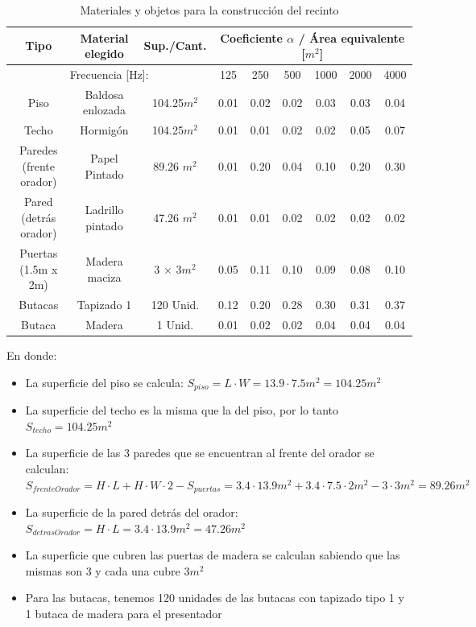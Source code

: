 \begin{table}[H]
    \centering
    \begin{tabular}{|c|c|c||c|c|c|c|c|c|} \hline
        Tipo &  Material elegido &Sup./Cant. & \multicolumn{6}{|c|}{Coeficiente $\alpha$ / Área equivalente [$m^2$]} \\ \hline
        \multicolumn{3}{|c|}{Frecuencia [Hz]:} & 125 & 250 & 500 & 1000 & 2000 & 4000 \\ \hline \hline
        Piso & Baldosa enlozada & 104.25$m^2$ & 0.01 & 0.02 & 0.02 & 0.03 & 0.03 & 0.04 \\ \hline
        Techo & Hormigón & 104.25$m^2$ & 0.01 & 0.01 & 0.02 & 0.02 & 0.05 & 0.07 \\ \hline
        Paredes (frente orador) & Papel Pintado & 89.26 $m^2$ & 0.01 & 0.20 & 0.04 & 0.10 & 0.20 & 0.30 \\ \hline
        Pared (detrás orador) & Ladrillo pintado & 47.26 $m^2$ & 0.01 & 0.01 & 0.02 & 0.02 & 0.02 & 0.02 \\ \hline
        Puertas (1.5m x 2m) & Madera maciza & 3 $\times$ 3$m^2$ & 0.05 & 0.11 & 0.10 & 0.09 & 0.08 &  0.10 \\ \hline \hline
        Butacas & Tapizado 1 & 120 Unid. & 0.12 & 0.20 & 0.28 & 0.30 & 0.31 & 0.37 \\ \hline
        Butaca & Madera & 1 Unid. & 0.01 & 0.02 & 0.02 & 0.04 & 0.04 & 0.04 \\ \hline
    \end{tabular}
    \caption{Materiales y objetos para la construcción del recinto}
    \label{tab:materiales_construccion_recinto}
\end{table}

\par En donde:

\begin{itemize}
    \item La superficie del piso se calcula: $S_{piso} = L \cdot W = 13.9 \cdot 7.5m^2 = 104.25m^2$
    \item La superficie del techo es la misma que la del piso, por lo tanto $S_{techo} = 104.25m^2$
    \item La superficie de las 3 paredes que se encuentran al frente del orador se calculan: $S_{frenteOrador} = H \cdot L + H \cdot W \cdot 2 - S_{puertas} = 3.4 \cdot 13.9 m^2+ 3.4 \cdot 7.5 \cdot 2 m^2 - 3 \cdot 3m^2 = 89.26m^2$
    \item La superficie de la pared detrás del orador: $S_{detrasOrador} = H \cdot L = 3.4 \cdot 13.9 m^2 = 47.26m^2$
    \item La superficie que cubren las puertas de madera se calculan sabiendo que las mismas son 3 y cada una cubre $3m^2$
    \item Para las butacas, tenemos 120 unidades de las butacas con tapizado tipo 1 y 1 butaca de madera para el presentador
\end{itemize}

